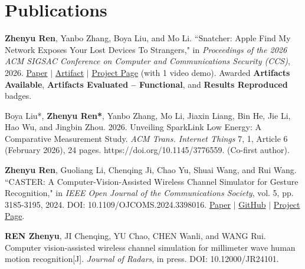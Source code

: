 \documentclass[letterpaper,10pt]{article}
\newcommand{\resumeSubHeadingListStart}{\begin{itemize}[leftmargin=0.15in, label={}]}
\newcommand{\resumeSubHeadingListEnd}{\end{itemize}\vspace{-5pt}}
\begin{document}
\section{Publications}
\vspace{3pt}
\resumeSubHeadingListStart
\small{\item{
    \textbf{Zhenyu Ren}, Yanbo Zhang, Boya Liu, and Mo Li. ``Snatcher: Apple Find My Network Exposes Your Lost Devices To Strangers," in \textit{Proceedings of the 2026 ACM SIGSAC Conference on Computer and Communications Security (CCS)}, 2026.
    \href{https://arxiv.org/abs/2606.21067}{\color{blue}Paper} $|$ \href{https://github.com/rzy0901/Snatcher}{\color{blue}Artifact} $|$ \href{https://wands-hkust.github.io/Snatcher/}{\color{blue}Project Page} (with 1 video demo).
    Awarded \textbf{Artifacts Available}, \textbf{Artifacts Evaluated -- Functional}, and \textbf{Results Reproduced} badges.

    Boya Liu*, \textbf{Zhenyu Ren*}, Yanbo Zhang, Mo Li, Jiaxin Liang, Bin He, Jie Li, Hao Wu, and Jingbin Zhou. 2026. Unveiling SparkLink Low Energy: A Comparative Measurement Study. \textit{ACM Trans. Internet Things} 7, 1, Article 6 (February 2026), 24 pages. https://doi.org/10.1145/3776559. (Co-first author).

    \textbf{Zhenyu Ren}, Guoliang Li, Chenqing Ji, Chao Yu, Shuai Wang, and Rui Wang. ``CASTER: A Computer-Vision-Assisted Wireless Channel Simulator for Gesture Recognition," in \textit{IEEE Open Journal of the Communications Society}, vol. 5, pp. 3185-3195, 2024. DOI: 10.1109/OJCOMS.2024.3398016.
    \href{https://doi.org/10.1109/ojcoms.2024.3398016}{\color{blue}Paper} $|$ \href{https://github.com/rzy0901/testSpectrogram}{\color{blue}GitHub}  $|$ \href{https://lasso-sustech.github.io/CASTER/}{\color{blue}Project Page}.
    }
    \item{\textbf{REN Zhenyu}, JI Chenqing, YU Chao, CHEN Wanli, and WANG Rui. Computer vision-assisted wireless channel simulation for millimeter wave human motion recognition[J]. \textit{Journal of Radars},  in press. DOI:  10.12000/JR24101.
    }
}
\resumeSubHeadingListEnd

\end{document}
